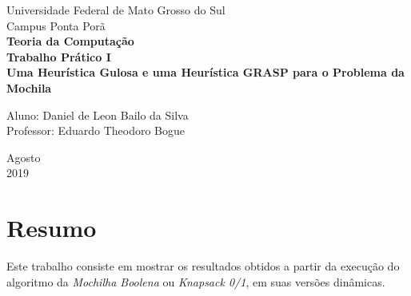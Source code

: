 \documentclass[a4paper, 12pt]{article}
\begin{document}
\begin{titlepage}
    \begin{center}
		\LARGE{Universidade Federal de Mato Grosso do Sul}\\
		\vspace{5pt}
        \large{Campus Ponta Porã}\\ 
        \large{{\textbf{Teoria da Computação}}}\\ 
        \vspace{15pt}
        \vspace{95pt}
        \textbf{\large{Trabalho Prático I}}\\
        \vspace{15pt}
        \textbf{\LARGE{Uma Heurística Gulosa e uma Heurística GRASP para o
        Problema da Mochila}}\\
        \vspace{3,5cm}
    \end{center}
    
    \begin{flushleft}
        \begin{tabbing}
            Aluno: Daniel de Leon Bailo da Silva\\            
            Professor: Eduardo Theodoro Bogue\\
    \end{tabbing}
 \end{flushleft}
    \vspace{1cm}
    
    \begin{center}
        \vspace{\fill}
            Agosto\\
         2019
            \end{center}
\end{titlepage}

\clearpage
\tableofcontents
\thispagestyle{empty}
\clearpage


\section*{Resumo}
\label{sec:resumo}
Este trabalho consiste em mostrar os resultados obtidos a partir da execução
do algoritmo da {\it Mochilha Boolena} ou {\it Knapsack 0/1}, em suas versões dinâmicas.
\end{document}
